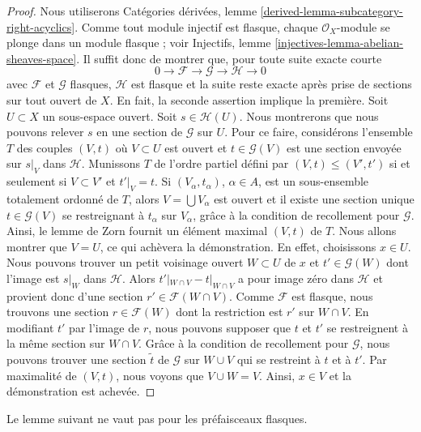 \begin{proof}

Nous utiliserons Catégories dérivées, lemme \ref{derived-lemma-subcategory-right-acyclics}. Comme tout module injectif est flasque, chaque $\mathcal{O}_X$-module se plonge dans un module flasque ; voir Injectifs, lemme \ref{injectives-lemma-abelian-sheaves-space}. Il suffit donc de montrer que, pour toute suite exacte courte
$$
0 \to \mathcal{F} \to \mathcal{G} \to \mathcal{H} \to 0
$$
avec $\mathcal{F}$ et $\mathcal{G}$ flasques, $\mathcal{H}$
est flasque et la suite reste exacte après prise de sections sur tout ouvert de $X$. En fait, la seconde assertion implique la première. Soit $U \subset X$ un sous-espace ouvert. Soit $s \in \mathcal{H}(U)$. Nous montrerons que nous pouvons relever $s$ en une section de $\mathcal{G}$
sur $U$. Pour ce faire, considérons l'ensemble $T$ des couples $(V, t)$
où $V \subset U$ est ouvert et $t \in \mathcal{G}(V)$ est une section envoyée sur $s|_V$ dans $\mathcal{H}$. Munissons $T$ de l'ordre partiel défini par
$(V, t) \leq (V', t')$ si et seulement si $V \subset V'$ et $t'|_V = t$. Si $(V_\alpha, t_\alpha)$, $\alpha \in A$,
est un sous-ensemble totalement ordonné de $T$, alors $V = \bigcup V_\alpha$
est ouvert et il existe une section unique $t \in \mathcal{G}(V)$
se restreignant à $t_\alpha$ sur $V_\alpha$, grâce à la condition de recollement pour
$\mathcal{G}$. Ainsi, le lemme de Zorn fournit un élément maximal
$(V, t)$ de $T$. Nous allons montrer que $V = U$, ce qui achèvera la démonstration. En effet, choisissons $x \in U$. Nous pouvons trouver un petit voisinage ouvert
$W \subset U$ de $x$ et $t' \in \mathcal{G}(W)$ dont l'image est $s|_W$
dans $\mathcal{H}$. Alors $t'|_{W \cap V} - t|_{W \cap V}$ a pour image zéro dans $\mathcal{H}$ et provient donc d'une section
$r' \in \mathcal{F}(W \cap V)$. Comme $\mathcal{F}$ est flasque, nous trouvons une section $r \in \mathcal{F}(W)$ dont la restriction est $r'$
sur $W \cap V$. En modifiant $t'$ par l'image de $r$, nous pouvons supposer que $t$ et $t'$ se restreignent à la même section sur
$W \cap V$. Grâce à la condition de recollement pour $\mathcal{G}$,
nous pouvons trouver une section $\tilde t$ de $\mathcal{G}$ sur
$W \cup V$ qui se restreint à $t$ et à $t'$. Par maximalité de $(V, t)$, nous voyons que $V \cup W = V$. Ainsi, $x \in V$ et la démonstration est achevée.

\end{proof}

\noindent
Le lemme suivant ne vaut pas pour les préfaisceaux flasques.

